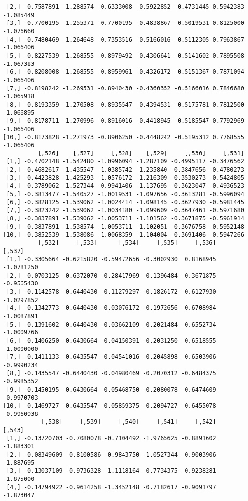 \documentclass[
  letterpaper,
  DIV=11,
  numbers=noendperiod]{scrreprt}
\begin{document}
\begin{verbatim}
 [2,] -0.7587891 -1.288574 -0.6333008 -0.5922852 -0.4731445 0.5942383 -1.085449
 [3,] -0.7700195 -1.255371 -0.7700195 -0.4838867 -0.5019531 0.8125000 -1.076660
 [4,] -0.7480469 -1.264648 -0.7353516 -0.5166016 -0.5112305 0.7963867 -1.066406
 [5,] -0.8227539 -1.268555 -0.8979492 -0.4306641 -0.5141602 0.7895508 -1.067383
 [6,] -0.8208008 -1.268555 -0.8959961 -0.4326172 -0.5151367 0.7871094 -1.066406
 [7,] -0.8198242 -1.269531 -0.8940430 -0.4360352 -0.5166016 0.7846680 -1.065918
 [8,] -0.8193359 -1.270508 -0.8935547 -0.4394531 -0.5175781 0.7812500 -1.066895
 [9,] -0.8178711 -1.270996 -0.8916016 -0.4418945 -0.5185547 0.7792969 -1.066406
[10,] -0.8173828 -1.271973 -0.8906250 -0.4448242 -0.5195312 0.7768555 -1.066406
          [,526]    [,527]     [,528]    [,529]     [,530]     [,531]
 [1,] -0.4702148 -1.542480 -1.0996094 -1.287109 -0.4995117 -0.3476562
 [2,] -0.4682617 -1.435547 -1.0385742 -1.235840 -0.3847656 -0.4780273
 [3,] -0.4423828 -1.425293 -1.0576172 -1.216309 -0.3530273 -0.5424805
 [4,] -0.3789062 -1.527344 -0.9941406 -1.137695 -0.3623047 -0.4936523
 [5,] -0.3813477 -1.540527 -1.0019531 -1.097656 -0.3613281 -0.5996094
 [6,] -0.3828125 -1.539062 -1.0024414 -1.098145 -0.3627930 -0.5981445
 [7,] -0.3823242 -1.539062 -1.0034180 -1.099609 -0.3647461 -0.5971680
 [8,] -0.3837891 -1.539062 -1.0053711 -1.101562 -0.3671875 -0.5961914
 [9,] -0.3837891 -1.538574 -1.0053711 -1.102051 -0.3676758 -0.5952148
[10,] -0.3852539 -1.538086 -1.0068359 -1.104004 -0.3691406 -0.5947266
          [,532]     [,533]      [,534]     [,535]     [,536]     [,537]
 [1,] -0.3305664 -0.6215820 -0.59472656 -0.3002930  0.8168945 -1.0781250
 [2,] -0.0703125 -0.6372070 -0.28417969 -0.1396484 -0.3671875 -0.9565430
 [3,] -0.1142578 -0.6440430 -0.11279297 -0.1826172 -0.6127930 -1.0297852
 [4,] -0.1342773 -0.6440430 -0.03076172 -0.1972656 -0.6708984 -1.0087891
 [5,] -0.1391602 -0.6440430 -0.03662109 -0.2021484 -0.6552734 -1.0009766
 [6,] -0.1406250 -0.6430664 -0.04150391 -0.2031250 -0.6518555 -1.0000000
 [7,] -0.1411133 -0.6435547 -0.04541016 -0.2045898 -0.6503906 -0.9990234
 [8,] -0.1435547 -0.6440430 -0.04980469 -0.2070312 -0.6484375 -0.9985352
 [9,] -0.1450195 -0.6430664 -0.05468750 -0.2080078 -0.6474609 -0.9970703
[10,] -0.1469727 -0.6435547 -0.05859375 -0.2094727 -0.6455078 -0.9960938
           [,538]     [,539]     [,540]     [,541]     [,542]    [,543]
 [1,] -0.13720703 -0.7080078 -0.7104492 -1.9765625 -0.8891602 -1.883301
 [2,] -0.08349609 -0.8100586 -0.9843750 -1.0527344 -0.9003906 -1.887695
 [3,] -0.13037109 -0.9736328 -1.1118164 -0.7734375 -0.9238281 -1.875000
 [4,] -0.14794922 -0.9614258 -1.3452148 -0.7182617 -0.9091797 -1.873047

\end{verbatim}
\end{document}
